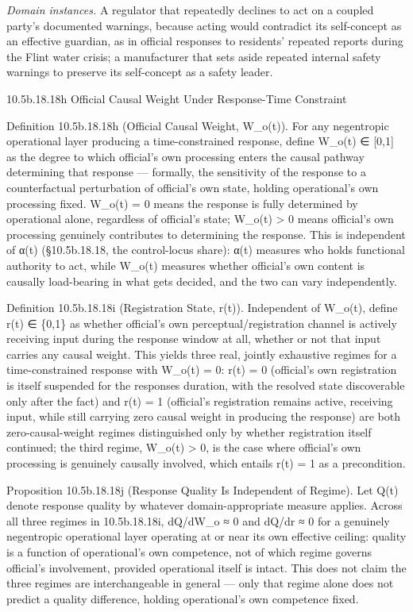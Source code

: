 \documentclass[
]{article}
\begin{document}
\emph{Domain instances.} A regulator that repeatedly declines to act on
a coupled party's documented warnings, because acting would contradict
its self-concept as an effective guardian, as in official responses to
residents' repeated reports during the Flint water crisis; a
manufacturer that sets aside repeated internal safety warnings to
preserve its self-concept as a safety leader.

10.5b.18.18h Official Causal Weight Under Response-Time Constraint

Definition 10.5b.18.18h (Official Causal Weight, W\_o(t)). For any
negentropic operational layer producing a time-constrained response,
define W\_o(t) ∈ {[}0,1{]} as the degree to which official's own
processing enters the causal pathway determining that response ---
formally, the sensitivity of the response to a counterfactual
perturbation of official's own state, holding operational's own
processing fixed. W\_o(t) = 0 means the response is fully determined by
operational alone, regardless of official's state; W\_o(t)
\textgreater{} 0 means official's own processing genuinely contributes
to determining the response. This is independent of α(t) (§10.5b.18.18,
the control-locus share): α(t) measures who holds functional authority
to act, while W\_o(t) measures whether official's own content is
causally load-bearing in what gets decided, and the two can vary
independently.

Definition 10.5b.18.18i (Registration State, r(t)). Independent of
W\_o(t), define r(t) ∈ \{0,1\} as whether official's own
perceptual/registration channel is actively receiving input during the
response window at all, whether or not that input carries any causal
weight. This yields three real, jointly exhaustive regimes for a
time-constrained response with W\_o(t) = 0: r(t) = 0 (official's own
registration is itself suspended for the responses duration, with the
resolved state discoverable only after the fact) and r(t) = 1
(official's registration remains active, receiving input, while still
carrying zero causal weight in producing the response) are both
zero-causal-weight regimes distinguished only by whether registration
itself continued; the third regime, W\_o(t) \textgreater{} 0, is the
case where official's own processing is genuinely causally involved,
which entails r(t) = 1 as a precondition.

Proposition 10.5b.18.18j (Response Quality Is Independent of Regime).
Let Q(t) denote response quality by whatever domain-appropriate measure
applies. Across all three regimes in 10.5b.18.18i, dQ/dW\_o ≈ 0 and
dQ/dr ≈ 0 for a genuinely negentropic operational layer operating at or
near its own effective ceiling: quality is a function of operational's
own competence, not of which regime governs official's involvement,
provided operational itself is intact. This does not claim the three
regimes are interchangeable in general --- only that regime alone does
not predict a quality difference, holding operational's own competence
fixed.
\end{document}
